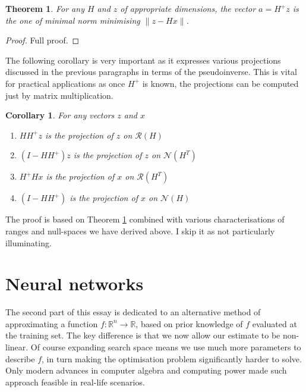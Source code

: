 \documentclass[a4paper]{article}
\theoremstyle{break}
\newtheorem{theorem}{Theorem}[section]
\newtheorem{corollary}{Corollary}[theorem]
\newcommand{\R}{\mathbb{R}}
\newcommand{\Nu}{\mathcal{N}}
\newcommand{\Ra}{\mathcal{R}}
\begin{document}
\begin{theorem}\label{thm:mp_solves_regression}
    For any $H$ and $z$ of appropriate dimensions, the vector $a = H^+ z$ is the one of minimal norm minimising $ \| z - H x \| $.
\end{theorem}

\begin{proof}
    Full proof.
\end{proof}

The following corollary is very important as it expresses various projections discussed in the previous paragraphs in terms of the pseudoinverse. This is vital for practical applications as once $ H^+ $ is known, the projections can be computed just by matrix multiplication.

\begin{corollary}
    For any vectors $z$ and $x$
    \begin{enumerate}
        \item $ H H^+ z $ is the projection of $z$ on $\Ra(H)$
        \item $ (I - H H^+) z $ is the projection of $z$ on $\Nu(H^T)$
        \item $ H^+ H x$ is the projection of $x$ on $ \Ra(H^T)$
        \item $ (I - H H^+) $ is the projection of $x$ on $ \Nu(H)$
    \end{enumerate}
\end{corollary}

The proof is based on Theorem \ref{thm:mp_solves_regression} combined with various characterisations of ranges and null-spaces we have derived above. I skip it as not particularly illuminating.








\pagebreak
\section{Neural networks}
The second part of this essay is dedicated to an alternative method of approximating a function $ f : \R^n \to \R$, based on prior knowledge of $f$ evaluated at the training set. The key difference is that we now allow our estimate to be non-linear. Of course expanding search space means we use much more parameters to describe $f$, in turn making the optimisation problem significantly harder to solve. Only modern advances in computer algebra and computing power made such approach feasible in real-life scenarios.
\end{document}
